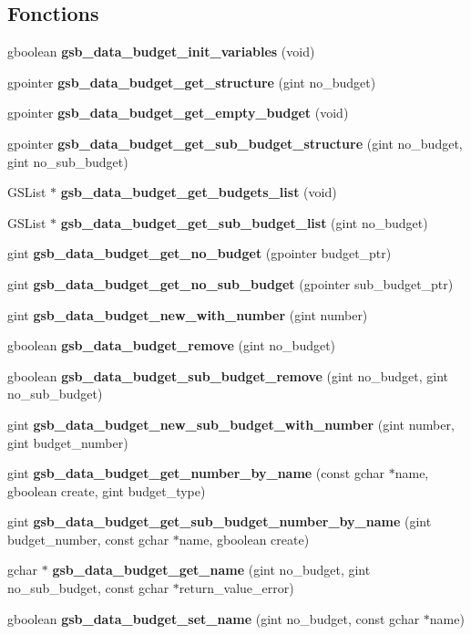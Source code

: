 \subsection*{Fonctions}
\begin{DoxyCompactItemize}
\item 
gboolean {\bf gsb\_\-data\_\-budget\_\-init\_\-variables} (void)
\item 
gpointer {\bf gsb\_\-data\_\-budget\_\-get\_\-structure} (gint no\_\-budget)
\item 
gpointer {\bf gsb\_\-data\_\-budget\_\-get\_\-empty\_\-budget} (void)
\item 
gpointer {\bf gsb\_\-data\_\-budget\_\-get\_\-sub\_\-budget\_\-structure} (gint no\_\-budget, gint no\_\-sub\_\-budget)
\item 
GSList $\ast$ {\bf gsb\_\-data\_\-budget\_\-get\_\-budgets\_\-list} (void)
\item 
GSList $\ast$ {\bf gsb\_\-data\_\-budget\_\-get\_\-sub\_\-budget\_\-list} (gint no\_\-budget)
\item 
gint {\bf gsb\_\-data\_\-budget\_\-get\_\-no\_\-budget} (gpointer budget\_\-ptr)
\item 
gint {\bf gsb\_\-data\_\-budget\_\-get\_\-no\_\-sub\_\-budget} (gpointer sub\_\-budget\_\-ptr)
\item 
gint {\bf gsb\_\-data\_\-budget\_\-new\_\-with\_\-number} (gint number)
\item 
gboolean {\bf gsb\_\-data\_\-budget\_\-remove} (gint no\_\-budget)
\item 
gboolean {\bf gsb\_\-data\_\-budget\_\-sub\_\-budget\_\-remove} (gint no\_\-budget, gint no\_\-sub\_\-budget)
\item 
gint {\bf gsb\_\-data\_\-budget\_\-new\_\-sub\_\-budget\_\-with\_\-number} (gint number, gint budget\_\-number)
\item 
gint {\bf gsb\_\-data\_\-budget\_\-get\_\-number\_\-by\_\-name} (const gchar $\ast$name, gboolean create, gint budget\_\-type)
\item 
gint {\bf gsb\_\-data\_\-budget\_\-get\_\-sub\_\-budget\_\-number\_\-by\_\-name} (gint budget\_\-number, const gchar $\ast$name, gboolean create)
\item 
gchar $\ast$ {\bf gsb\_\-data\_\-budget\_\-get\_\-name} (gint no\_\-budget, gint no\_\-sub\_\-budget, const gchar $\ast$return\_\-value\_\-error)
\item 
gboolean {\bf gsb\_\-data\_\-budget\_\-set\_\-name} (gint no\_\-budget, const gchar $\ast$name)
\item 

\end{DoxyCompactItemize}
